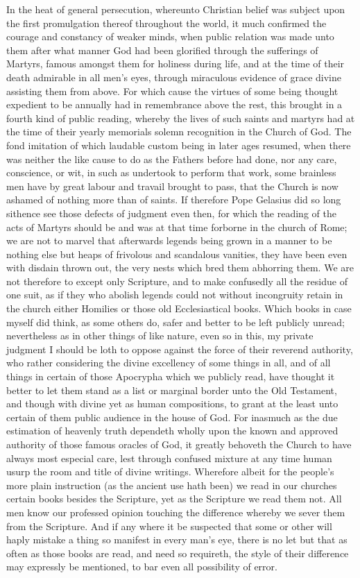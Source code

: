 In the heat of general persecution, whereunto Christian belief was subject upon the first promulgation thereof throughout the world, it much confirmed the courage and constancy of weaker minds, when public relation was made unto them after what manner God had been glorified through the sufferings of Martyrs, famous amongst them for holiness during life, and at the time of their death admirable in all men’s eyes, through miraculous evidence of grace divine assisting them from above. For which cause the virtues of some being thought expedient to be annually had in remembrance above the rest, this brought in a fourth kind of public reading, whereby the lives of such saints and martyrs had at the time of their yearly memorials solemn recognition in the Church of God. The fond imitation of which laudable custom being in later ages resumed, when there was neither the like cause to do as the Fathers before had done, nor any care, conscience, or wit, in such as undertook to perform that work, some brainless men have by great labour and travail brought to pass, that the Church is now ashamed of nothing more than of saints. If therefore Pope Gelasius did so long sithence see  those defects of judgment even then, for which the reading of the acts of Martyrs should be and was at that time forborne in the church of Rome; we are not to marvel that afterwards legends being grown in a manner to be nothing else but heaps of frivolous and scandalous vanities, they have been even with disdain thrown out, the very nests which bred them abhorring them. We are not therefore to except only Scripture, and to make confusedly all the residue of one suit, as if they who abolish legends could not without incongruity retain in the church either Homilies or those old Ecclesiastical books.
Which books in case myself did think, as some others do, safer and better to be left publicly unread; nevertheless as in other things of like nature, even so in this, my private judgment I should be loth to oppose against the force of their reverend authority, who rather considering the divine excellency of some things in all, and of all things in certain of those Apocrypha which we publicly read, have thought it  better to let them stand as a list or marginal border unto the Old Testament, and though with divine yet as human compositions, to grant at the least unto certain of them public audience in the house of God. For inasmuch as the due estimation of heavenly truth dependeth wholly upon the known and approved authority of those famous oracles of God, it greatly behoveth the Church to have always most especial care, lest through confused mixture at any time human usurp the room and title of divine writings. Wherefore albeit for the people’s more plain instruction (as the ancient use hath been) we read in our churches certain books besides the Scripture, yet as the Scripture we read them not. All men know our professed opinion touching the difference whereby we sever them from the Scripture. And if any where it be suspected that some or other will haply mistake a thing so manifest in every man’s eye, there is no let but that as often as those books are read, and need so requireth, the style of their difference may expressly be mentioned, to bar even all possibility of error.
